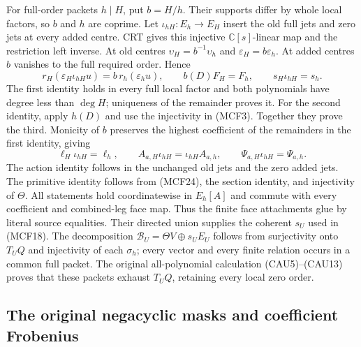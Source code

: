 For full-order packets $h\mid H$, put $b=H/h$.  Their supports differ by
whole local factors, so $b$ and $h$ are coprime.  Let
$\iota_{hH}:E_h\to E_H$ insert the old full jets and zero jets at every
added centre.  CRT gives this injective $\mathbb C[s]$-linear map and
the restriction left inverse.  At old centres $\upsilon_H=b^{-1}\upsilon_h$
and $\varepsilon_H=b\varepsilon_h$.  At added centres $b$ vanishes to
the full required order.  Hence
\[
r_H(\varepsilon_H\iota_{hH}u)=b\,r_h(\varepsilon_hu),\qquad
b(D)F_H=F_h,\qquad s_H\iota_{hH}=s_h.
\tag{MCF26}
\]
The first identity holds in every full local factor and both polynomials
have degree less than $\deg H$; uniqueness of the remainder proves it.
For the second identity, apply $h(D)$ and use the injectivity in (MCF3).
Together they prove the third.  Monicity of $b$ preserves the highest
coefficient of the remainders in the first identity, giving
\[
\ell_H\iota_{hH}=\ell_h,\qquad
A_{a,H}\iota_{hH}=\iota_{hH}A_{a,h},\qquad
\Psi_{a,H}\iota_{hH}=\Psi_{a,h}.
\tag{MCF27}
\]
The action identity follows in the unchanged old jets and the zero added
jets.  The primitive identity follows from (MCF24), the section identity,
and injectivity of $\Theta$.  All statements hold coordinatewise in
$E_h[A]$ and commute with every coefficient and combined-leg face map.
Thus the finite face attachments glue by literal source equalities.
Their directed union supplies the coherent $s_U$ used in (MCF18).
The decomposition $\mathscr B_U=\Theta V\oplus s_UE_U$ follows from
surjectivity onto $T_UQ$ and injectivity of each $\sigma_h$; every vector
and every finite relation occurs in a common full packet.  The original
all-polynomial calculation (CAU5)--(CAU13) proves that these packets
exhaust $T_UQ$, retaining every local zero order.

\subsection{The original negacyclic masks and coefficient Frobenius}

